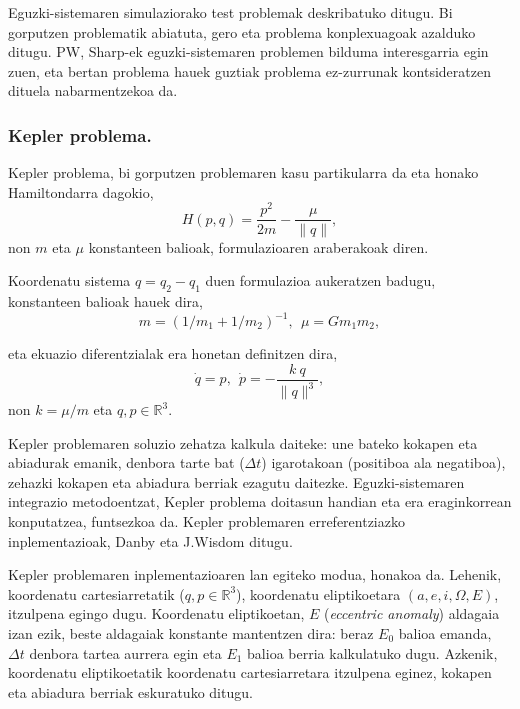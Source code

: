Eguzki-sistemaren simulaziorako test problemak deskribatuko ditugu. Bi gorputzen problematik abiatuta, gero eta problema konplexuagoak azalduko ditugu. PW, Sharp-ek \cite{Sharp2001} eguzki-sistemaren problemen bilduma interesgarria egin zuen, eta bertan problema hauek guztiak  problema ez-zurrunak kontsideratzen dituela nabarmentzekoa da.      

\subsubsection*{Kepler problema.}
\label{ss:keplerproblem}

Kepler problema, bi gorputzen problemaren kasu partikularra da eta  honako Hamiltondarra dagokio,
\begin{equation}
H(p,q)=\frac{p^2}{2m}-\frac{\mu}{\|q\|},
\end{equation}
non $m$ eta $\mu$ konstanteen balioak, formulazioaren araberakoak diren.

Koordenatu sistema $q=q_2-q_1$ duen formulazioa aukeratzen badugu, konstanteen balioak hauek dira,  
\begin{equation*}
m=(1/m_1+1/m_2)^{-1},\ \ \mu=Gm_1m_2,
\end{equation*} 

eta ekuazio diferentzialak era honetan definitzen dira,
\begin{equation}
\dot{q}=p, \ \ \dot{p}= - \frac{k \ q}{\|q\|^3} ,
\end{equation}
non $k= \mu / m$ eta  $q,p \in \mathbb{R}^3$.

Kepler problemaren soluzio zehatza kalkula daiteke: une bateko kokapen eta abiadurak emanik, denbora tarte bat ($\Delta t$) igarotakoan (positiboa ala negatiboa), zehazki kokapen eta abiadura berriak ezagutu daitezke. Eguzki-sistemaren integrazio metodoentzat, Kepler problema doitasun handian eta era eraginkorrean konputatzea, funtsezkoa da. Kepler problemaren erreferentziazko inplementazioak, Danby \cite{Danby1992} eta J.Wisdom  \cite{Wisdom2015} ditugu. 

Kepler problemaren inplementazioaren lan egiteko modua, honakoa da. Lehenik, koordenatu cartesiarretatik ($q,p\in \mathbb{R}^3$), koordenatu eliptikoetara $(a,e,i,\Omega,E)$, itzulpena egingo dugu. Koordenatu eliptikoetan, $E$ (\emph{eccentric anomaly}) aldagaia izan ezik, beste aldagaiak konstante mantentzen dira: beraz $E_0$ balioa emanda, $\Delta t$ denbora tartea aurrera egin eta $E_1$ balioa berria kalkulatuko dugu. Azkenik, koordenatu eliptikoetatik koordenatu cartesiarretara itzulpena eginez, kokapen eta abiadura berriak eskuratuko ditugu. 

